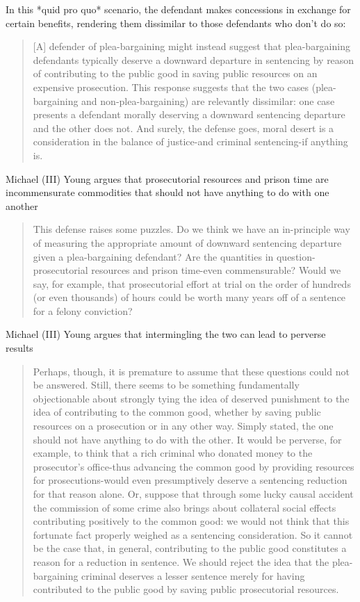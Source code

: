 In this *quid pro quo* scenario, the defendant makes concessions in exchange for certain benefits, rendering them dissimilar to those defendants who don't do so:

\begin{quote}
    [A] defender of plea-bargaining might instead suggest that plea-bargaining defendants typically deserve a downward departure in sentencing by reason of contributing to the public good in saving public resources on an expensive prosecution. This response suggests that the two cases (plea-bargaining and non-plea-bargaining) are relevantly dissimilar: one case presents a defendant morally deserving a downward sentencing departure and the other does not. And surely, the defense goes, moral desert is a consideration in the balance of justice-and criminal sentencing-if anything is.
\end{quote}

Michael (III) Young argues that prosecutorial resources and prison time are incommensurate commodities that should not have anything to do with one another

\begin{quote}
    This defense raises some puzzles. Do we think we have an in-principle way of measuring the appropriate amount of downward sentencing departure given a plea-bargaining defendant? Are the quantities in question-prosecutorial resources and prison time-even commensurable? Would we say, for example, that prosecutorial effort at trial on the order of hundreds (or even thousands) of hours could be worth many years off of a sentence for a felony conviction?
\end{quote}

Michael (III) Young  argues that intermingling the two can lead to perverse results

\begin{quote}
    Perhaps, though, it is premature to assume that these questions could not be answered. Still, there seems to be something fundamentally objectionable about strongly tying the idea of deserved punishment to the idea of contributing to the common good, whether by saving public resources on a prosecution or in any other way. Simply stated, the one should not have anything to do with the other. It would be perverse, for example, to think that a rich criminal who donated money to the prosecutor's office-thus advancing the common good by providing resources for prosecutions-would even presumptively deserve a sentencing reduction for that reason alone. Or, suppose that through some lucky causal accident the commission of some crime also brings about collateral social effects contributing positively to the common good: we would not think that this fortunate fact properly weighed as a sentencing consideration. So it cannot be the case that, in general, contributing to the public good constitutes a reason for a reduction in sentence. We should reject the idea that the plea-bargaining criminal deserves a lesser sentence merely for having contributed to the public good by saving public prosecutorial resources.
\end{quote}

